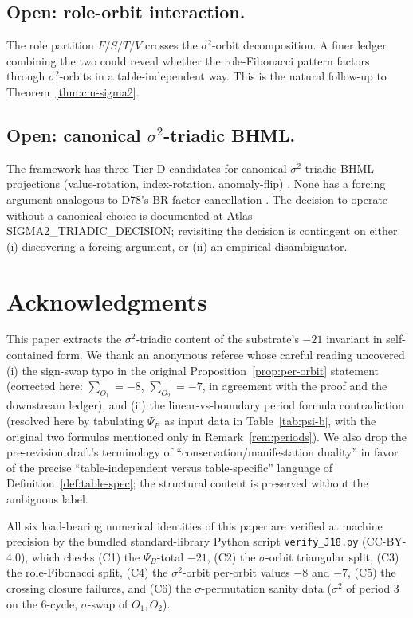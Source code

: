 \documentclass[11pt,reqno]{amsart}
\theoremstyle{plain}
\theoremstyle{definition}
\theoremstyle{remark}
\newcommand{\sig}{\sigma}
\begin{document}
\subsection{Open: role-orbit interaction.}
The role partition $F/S/T/V$ crosses the $\sig^{2}$-orbit
decomposition.  A finer ledger combining the two could reveal whether
the role-Fibonacci pattern factors through $\sig^{2}$-orbits in a
table-independent way.  This is the natural follow-up to
Theorem~\ref{thm:cm-sigma2}.

\subsection{Open: canonical $\sig^{2}$-triadic BHML.}
The framework has three Tier-D candidates for canonical
$\sig^{2}$-triadic BHML projections (value-rotation, index-rotation,
anomaly-flip) \cite{Atlas2026Tiering}.  None has a forcing argument
analogous to D78's BR-factor cancellation \cite{SandersGishFourCore}.
The decision to operate without a canonical choice is documented at
\cite{Atlas2026Tiering} Atlas SIGMA2\_TRIADIC\_DECISION; revisiting the
decision is contingent on either (i) discovering a forcing argument,
or (ii) an empirical disambiguator.

\section*{Acknowledgments}

This paper extracts the $\sig^{2}$-triadic content of the substrate's
$-21$ invariant in self-contained form.
We thank an anonymous referee whose careful reading uncovered
(i) the sign-swap typo in the original Proposition~\ref{prop:per-orbit}
statement (corrected here: $\sum_{O_1} = -8$, $\sum_{O_2} = -7$, in
agreement with the proof and the downstream ledger), and
(ii) the linear-vs-boundary period formula contradiction (resolved
here by tabulating $\Psi_B$ as input data in Table~\ref{tab:psi-b},
with the original two formulas mentioned only in Remark~\ref{rem:periods}).
We also drop the pre-revision draft's terminology of
``conservation/manifestation duality'' in favor of the precise
``table-independent versus table-specific'' language of
Definition~\ref{def:table-spec}; the structural content is preserved
without the ambiguous label.

All six load-bearing numerical identities of this paper are verified
at machine precision by the bundled standard-library Python script
\texttt{verify\_J18.py} (CC-BY-4.0), which checks (C1) the
$\Psi_B$-total $-21$, (C2) the $\sig$-orbit triangular split,
(C3) the role-Fibonacci split, (C4) the $\sig^{2}$-orbit per-orbit
values $-8$ and $-7$, (C5) the crossing closure failures, and
(C6) the $\sig$-permutation sanity data ($\sig^{2}$ of period 3 on
the $6$-cycle, $\sig$-swap of $O_{1}, O_{2}$).
\end{document}
